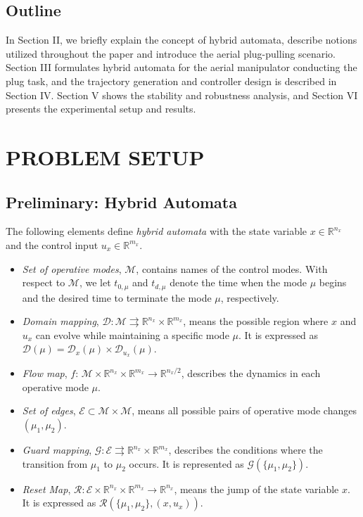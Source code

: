 \documentclass[letterpaper, 10 pt, conference]{ieeeconf}  %
\theoremstyle{definition}
\begin{document}
\subsection{Outline}
In Section II, we briefly explain the concept of hybrid automata, describe notions utilized throughout the paper and introduce the aerial plug-pulling scenario. Section III formulates hybrid automata for the aerial manipulator conducting the plug task, and the trajectory generation and controller design is described in Section IV. Section V shows the stability and robustness analysis, and Section VI presents the experimental setup and results.

\section{PROBLEM SETUP}
\subsection{Preliminary: Hybrid Automata}\label{subsec:prelim}
The following elements define \textit{hybrid automata} \cite{goebel2009hybrid} with the state variable $x \in \mathbb{R}^{n_x}$ and the control input $u_x \in \mathbb{R}^{m_x}$.
\begin{itemize}
    \item \textit{Set of operative modes}, $\mathcal{M}$, contains names of the control modes. With respect to $\mathcal{M}$, we let $t_{0, \mu}$ and $t_{d,\mu}$ denote the time when the mode $\mu$ begins and the desired time to terminate the mode $\mu$, respectively. 
    \item  \textit{Domain mapping}, $\mathcal{D}: \mathcal{M} \rightrightarrows \mathbb{R}^{n_x} \times \mathbb{R}^{m_x}$,
     means the possible region where $x$ and $u_x$ can evolve while maintaining a specific mode $\mu$. It is expressed as $\mathcal{D}(\mu) = \mathcal{D}_{x}(\mu) \times \mathcal{D}_{u_x}(\mu)$.
    \item  \textit{Flow map}, $f$: $\mathcal{M} \times \mathbb{R}^{n_x} \times \mathbb{R}^{m_x} \rightarrow \mathbb{R}^{n_x/2}$, describes the dynamics in each operative mode $\mu$.
    \item \textit{Set of edges}, $\mathcal{E} \subset \mathcal{M} \times \mathcal{M}$, means all possible pairs of operative mode changes $(\mu_1, \mu_2)$.
    \item  \textit{Guard mapping}, $\mathcal{G}: \mathcal{E} \rightrightarrows \mathbb{R}^{n_x} \times \mathbb{R}^{m_x}$, describes the conditions where the transition from $\mu_1$ to $\mu_2$ occurs. It is represented as $\mathcal{G}(\{ \mu_1, \mu_2 \})$.
    \item \textit{Reset Map}, $\mathcal{R} : \mathcal{E} \times \mathbb{R}^{n_x} \times \mathbb{R}^{m_x} \rightarrow \mathbb{R}^{n_x}$, means the jump of the state variable $x$. It is expressed as $\mathcal{R}(\{ \mu_1,\mu_2 \},(x, u_{x}))$.
\end{itemize}
\end{document}
